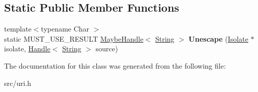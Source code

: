 \subsection*{Static Public Member Functions}
\begin{DoxyCompactItemize}
\item 
\hypertarget{classv8_1_1internal_1_1_u_r_i_unescape_aab4a31857b6e317d77e1137c5dc95f28}{}{\footnotesize template$<$typename Char $>$ }\\static M\+U\+S\+T\+\_\+\+U\+S\+E\+\_\+\+R\+E\+S\+U\+L\+T \hyperlink{classv8_1_1internal_1_1_maybe_handle}{Maybe\+Handle}$<$ \hyperlink{classv8_1_1internal_1_1_string}{String} $>$ {\bfseries Unescape} (\hyperlink{classv8_1_1internal_1_1_isolate}{Isolate} $\ast$isolate, \hyperlink{classv8_1_1internal_1_1_handle}{Handle}$<$ \hyperlink{classv8_1_1internal_1_1_string}{String} $>$ source)\label{classv8_1_1internal_1_1_u_r_i_unescape_aab4a31857b6e317d77e1137c5dc95f28}

\end{DoxyCompactItemize}


The documentation for this class was generated from the following file\+:\begin{DoxyCompactItemize}
\item 
src/uri.\+h\end{DoxyCompactItemize}
